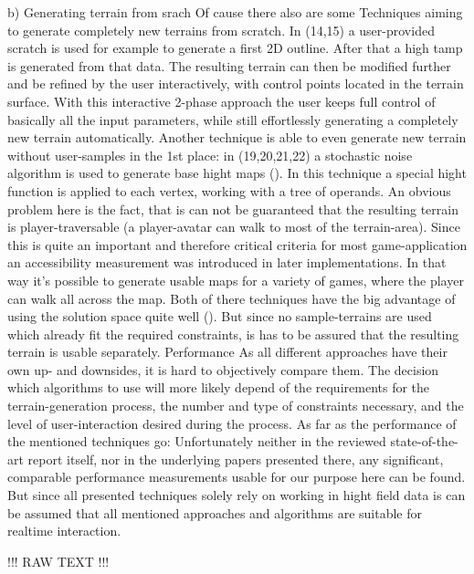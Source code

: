 b) Generating terrain from srach
Of cause there also are some Techniques aiming to generate completely new terrains from scratch. In (14,15) a user-provided scratch is used for example to generate a first 2D outline. After that a high tamp is generated from that data. The resulting terrain can then be modified further and be refined by the user interactively, with control points located in the terrain surface. With this interactive 2-phase approach the user keeps full control of basically all the input parameters, while still effortlessly generating a completely new terrain automatically.
Another technique is able to even generate new terrain without user-samples in the 1st place: in (19,20,21,22) a stochastic noise algorithm is used to generate base hight maps (). In this technique a special hight function is applied to each vertex, working with a tree of operands. An obvious problem here is the fact, that is can not be guaranteed that the resulting terrain is player-traversable (a player-avatar can walk to most of the terrain-area). Since this is quite an important and therefore critical criteria for most game-application an accessibility measurement was introduced in later implementations. In that way it’s possible to generate usable maps for a variety of games, where the player can walk all across the map.
Both of there techniques have the big advantage of using the solution space quite well (). But since no sample-terrains are used which already fit the required constraints, is has to be assured that the resulting terrain is usable separately.
Performance
As all different approaches have their own up- and downsides, it is hard to objectively compare them. The decision which algorithms to use will more likely depend of the requirements for the terrain-generation process, the number and type of constraints necessary, and the level of user-interaction desired during the process. As far as the performance of the mentioned techniques go: Unfortunately neither in the reviewed state-of-the-art report itself, nor in the underlying papers presented there, any significant, comparable performance measurements usable for our purpose here can be found. But since all presented techniques solely rely on working in hight field data is can be assumed that all mentioned approaches and algorithms are suitable for realtime interaction.

!!! RAW TEXT !!!